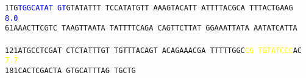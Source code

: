 \documentclass[11pt,twoside,reqno,a4paper]{article}
\begin{document}
\texttt{1\hspace*{3\charwidth}TG\textcolor{blue}{T}\textcolor{blue}{G}\textcolor{blue}{G}\textcolor{blue}{C}\textcolor{blue}{A}\textcolor{blue}{T}\textcolor{blue}{A}\textcolor{blue}{T}	\textcolor{blue}{G}\textcolor{blue}{T}GTATATTT	TCCATATGTT	AAAGTACATT	ATTTTACGCA	TTTACTGAAG	\\
\hspace*{4\charwidth}\hspace*{2\charwidth}\textcolor{blue}{8.0}\hspace*{1\charwidth}\hspace*{1\charwidth}\hspace*{1\charwidth}\hspace*{1\charwidth}\hspace*{1\charwidth}\hspace*{1\charwidth}\\
61\hspace*{2\charwidth}AAACTTCGTC	TAAGTTAATA	TATTTTCAGA	CAGTTCTTAT	GGAAATTATA	AATATCATTA	\\
\hspace*{4\charwidth}\hspace*{1\charwidth}\hspace*{1\charwidth}\hspace*{1\charwidth}\hspace*{1\charwidth}\hspace*{1\charwidth}\hspace*{1\charwidth}\\
121\hspace*{1\charwidth}ATGCCTCGAT	CTCTATTTGT	TGTTTACAGT	ACAGAAACGA	TTTTTGGC\textcolor{yellow}{C}\textcolor{yellow}{G}	\textcolor{yellow}{T}\textcolor{yellow}{G}\textcolor{yellow}{T}\textcolor{yellow}{A}\textcolor{yellow}{T}\textcolor{yellow}{C}\textcolor{yellow}{C}\textcolor{yellow}{C}AC	\\
\hspace*{4\charwidth}\hspace*{1\charwidth}\hspace*{1\charwidth}\hspace*{1\charwidth}\hspace*{1\charwidth}\hspace*{48\charwidth}\textcolor{yellow}{7.7}\hspace*{1\charwidth}\hspace*{1\charwidth}\\
181\hspace*{1\charwidth}CACTCGACTA	GTGCATTTAG	TGCTG\\
\hspace*{4\charwidth}\hspace*{1\charwidth}\hspace*{1\charwidth}\\
}
\end{document}
